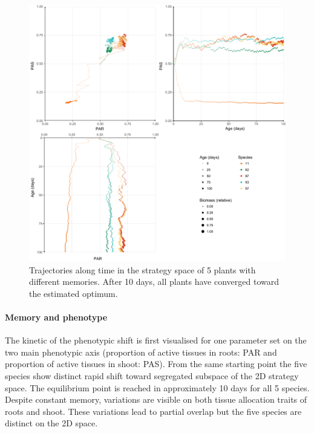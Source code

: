 



\begin{figure}\label{fig:plastic_allocation_trajectory}
\includegraphics[width = \textwidth]{./2_PP/Figures/Individual/memory_effect.pdf}
\caption{Trajectories along time in the strategy space of 5 plants with different memories. After 10 days, all plants have converged toward the estimated optimum.}
\end{figure}

\paragraph{Memory and phenotype}

The kinetic of the phenotypic shift is first visualised for one parameter set on the two main phenotypic axis (proportion of active tissues in roots: PAR and proportion of active tissues in shoot: PAS). From the same starting point the five species show distinct rapid shift toward segregated subspace of the 2D strategy space. The equilibrium point is reached in approximately 10 days for all 5 species. Despite constant memory, variations are visible on both tissue allocation traits of roots and shoot. These variations lead to partial overlap but the five species are distinct on the 2D space.

